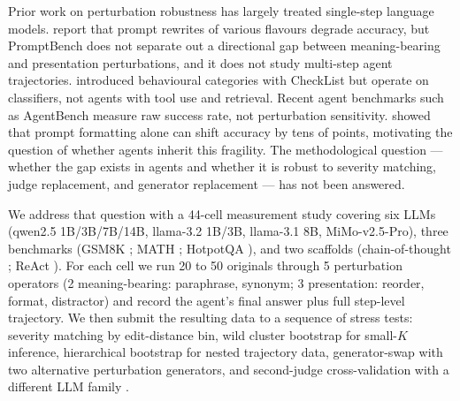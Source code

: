 \documentclass[11pt]{article}
\begin{document}
Prior work on perturbation robustness has largely treated single-step language models. \citet{Zhu2024PromptBench} report that prompt rewrites of various flavours degrade accuracy, but PromptBench does not separate out a directional gap between meaning-bearing and presentation perturbations, and it does not study multi-step agent trajectories. \citet{Ribeiro2020CheckList} introduced behavioural categories with CheckList but operate on classifiers, not agents with tool use and retrieval. Recent agent benchmarks such as AgentBench \citep{Liu2024AgentBench} measure raw success rate, not perturbation sensitivity. \citet{Sclar2024Formatting} showed that prompt formatting alone can shift accuracy by tens of points, motivating the question of whether agents inherit this fragility. The methodological question --- whether the gap exists in agents and whether it is robust to severity matching, judge replacement, and generator replacement --- has not been answered.

We address that question with a 44-cell measurement study covering six LLMs (qwen2.5 1B/3B/7B/14B, llama-3.2 1B/3B, llama-3.1 8B, MiMo-v2.5-Pro), three benchmarks (GSM8K \citep{Cobbe2021GSM8K}; MATH \citep{Hendrycks2021MATH}; HotpotQA \citep{Yang2018HotpotQA}), and two scaffolds (chain-of-thought \citep{Wei2022CoT}; ReAct \citep{Yao2023ReAct}). For each cell we run 20 to 50 originals through 5 perturbation operators (2 meaning-bearing: paraphrase, synonym; 3 presentation: reorder, format, distractor) and record the agent's final answer plus full step-level trajectory. We then submit the resulting data to a sequence of stress tests: severity matching by edit-distance bin, wild cluster bootstrap \citep{Cameron2008WildBoot, Roodman2019Boottest} for small-$K$ inference, hierarchical bootstrap for nested trajectory data, generator-swap with two alternative perturbation generators, and second-judge cross-validation with a different LLM family \citep{Zheng2023Judge}.
\end{document}
